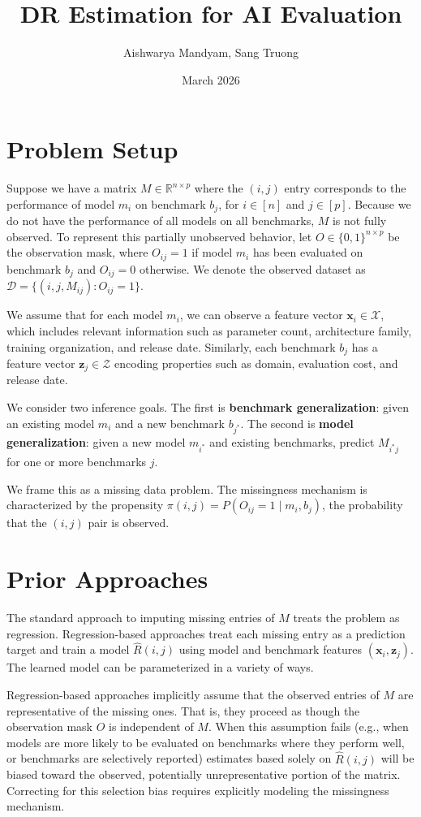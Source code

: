 \documentclass{article}
\title{DR Estimation for AI Evaluation}
\author{Aishwarya Mandyam, Sang Truong}
\date{March 2026}
\begin{document}
\maketitle

\section{Problem Setup}

Suppose we have a matrix $M \in \mathbb{R}^{n \times p}$ where the $(i, j)$ entry corresponds to the performance of model $m_i$ on benchmark $b_j$, for $i \in [n]$ and $j \in [p]$. Because we do not have the performance of all models on all benchmarks, $M$ is not fully observed. To represent this partially unobserved behavior, let $O \in \{0, 1\}^{n \times p}$ be the observation mask, where $O_{ij} = 1$ if model $m_i$ has been evaluated on benchmark $b_j$ and $O_{ij} = 0$ otherwise. We denote the observed dataset as $\mathcal{D} = \{(i, j, M_{ij}) : O_{ij} = 1\}$.

We assume that for each model $m_i$, we can observe a feature vector $\mathbf{x}_i \in \mathcal{X}$, which includes relevant information such as parameter count, architecture family, training organization, and release date. Similarly, each benchmark $b_j$ has a feature vector $\mathbf{z}_j \in \mathcal{Z}$ encoding properties such as domain, evaluation cost, and release date.

We consider two inference goals. The first is \textbf{benchmark generalization}: given an existing model $m_i$ and a new benchmark $b_{j^*}$. The second is \textbf{model generalization}: given a new model $m_{i^*}$ and existing benchmarks, predict $M_{i^*j}$ for one or more benchmarks $j$.

We frame this as a missing data problem. The missingness mechanism is characterized by the propensity $\pi(i, j) = P(O_{ij} = 1 \mid m_i, b_j)$, the probability that the $(i, j)$ pair is observed. 

\section{Prior Approaches}
The standard approach to imputing missing entries of $M$ treats the problem as regression. Regression-based approaches treat each missing entry as a prediction target and train a model $\hat{R}(i, j)$ using model and benchmark features $(\mathbf{x}_i, \mathbf{z}_j)$. The learned model can be parameterized in a variety of ways. 

Regression-based approaches implicitly assume that the observed entries of $M$ are representative of the missing ones. That is, they proceed as though the observation mask $O$ is independent of $M$. When this assumption fails (e.g., when models are more likely to be evaluated on benchmarks where they perform well, or benchmarks are selectively reported) estimates based solely on $\hat{R}(i, j)$ will be biased toward the observed, potentially unrepresentative portion of the matrix. Correcting for this selection bias requires explicitly modeling the missingness mechanism.
\end{document}
